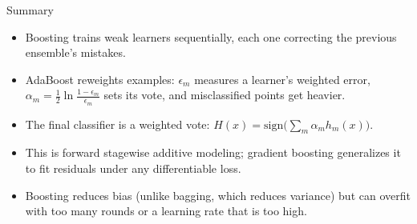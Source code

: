 \begin{frame}{Summary}
\begin{itemize}
  \item Boosting trains weak learners sequentially, each one correcting the previous ensemble's mistakes.
  \item AdaBoost reweights examples: $\epsilon_m$ measures a learner's weighted error, $\alpha_m=\tfrac12\ln\frac{1-\epsilon_m}{\epsilon_m}$ sets its vote, and misclassified points get heavier.
  \item The final classifier is a weighted vote: $H(x)=\mathrm{sign}\bigl(\sum_m \alpha_m h_m(x)\bigr)$.
  \item This is forward stagewise additive modeling; gradient boosting generalizes it to fit residuals under any differentiable loss.
  \item Boosting reduces bias (unlike bagging, which reduces variance) but can overfit with too many rounds or a learning rate that is too high.
\end{itemize}
\end{frame}
